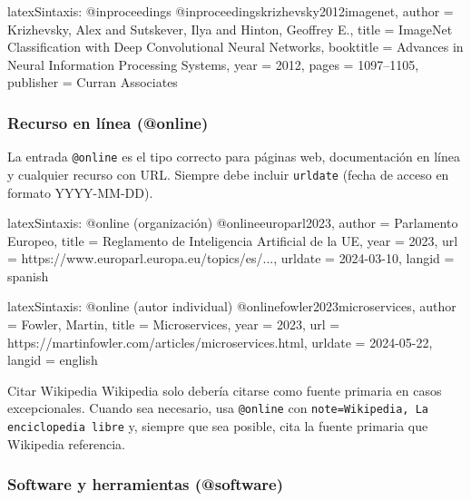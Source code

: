 \begin{codigosimple}{latex}{Sintaxis: @inproceedings}
@inproceedings{krizhevsky2012imagenet,
  author    = {Krizhevsky, Alex and Sutskever, Ilya
               and Hinton, Geoffrey E.},
  title     = {ImageNet Classification with Deep
               Convolutional Neural Networks},
  booktitle = {Advances in Neural Information
               Processing Systems},
  year      = {2012},
  pages     = {1097--1105},
  publisher = {Curran Associates}
}
\end{codigosimple}

\subsubsection{Recurso en línea (@online)}

La entrada \texttt{@online} es el tipo correcto para páginas web, documentación
en línea y cualquier recurso con URL. Siempre debe incluir \texttt{urldate}
(fecha de acceso en formato YYYY-MM-DD).

\begin{codigosimple}{latex}{Sintaxis: @online (organización)}
@online{europarl2023,
  author  = {{Parlamento Europeo}},
  title   = {Reglamento de Inteligencia Artificial de la UE},
  year    = {2023},
  url     = {https://www.europarl.europa.eu/topics/es/...},
  urldate = {2024-03-10},
  langid  = {spanish}
}
\end{codigosimple}

\begin{codigosimple}{latex}{Sintaxis: @online (autor individual)}
@online{fowler2023microservices,
  author  = {Fowler, Martin},
  title   = {Microservices},
  year    = {2023},
  url     = {https://martinfowler.com/articles/microservices.html},
  urldate = {2024-05-22},
  langid  = {english}
}
\end{codigosimple}

\begin{warningbox}{Citar Wikipedia}
Wikipedia solo debería citarse como fuente primaria en casos excepcionales.
Cuando sea necesario, usa \texttt{@online} con \texttt{note={Wikipedia,
La enciclopedia libre}} y, siempre que sea posible, cita la fuente
primaria que Wikipedia referencia.
\end{warningbox}

\subsubsection{Software y herramientas (@software)}

